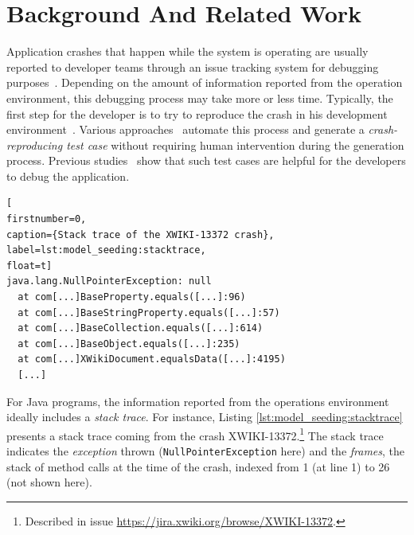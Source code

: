 
\section{Background And Related Work}\label{sec:model_seeding:background}


Application crashes that happen while the system is operating are usually reported to developer teams through an issue tracking system for debugging purposes~\cite{DBLP:conf/iwpc/WhiteVJBP15}. Depending on the amount of information reported from the operation environment, this debugging process may take more or less time. Typically, the first step for the developer is to try to reproduce the crash in his development environment~\cite{Zeller2009}. Various approaches~\cite{Chen2015, Nayrolles2017, Xuan2015, BPT17concrash, soltani2017} automate this process and generate a \emph{crash-reproducing test case} without requiring human intervention during the generation process.  Previous studies~\cite{Chen2015,Soltani2018a} show that such test cases are helpful for the developers to debug the application.

\begin{lstlisting}[
firstnumber=0,
caption={Stack trace of the XWIKI-13372 crash},
label=lst:model_seeding:stacktrace,
float=t]
java.lang.NullPointerException: null
  at com[...]BaseProperty.equals([...]:96)
  at com[...]BaseStringProperty.equals([...]:57)
  at com[...]BaseCollection.equals([...]:614)
  at com[...]BaseObject.equals([...]:235)
  at com[...]XWikiDocument.equalsData([...]:4195)
  [...]
\end{lstlisting}

For Java programs, the information reported from the operations environment ideally includes a \emph{stack trace}. For instance, Listing \ref{lst:model_seeding:stacktrace} presents a stack trace coming from the crash XWIKI-13372.\footnote{Described in  issue \url{https://jira.xwiki.org/browse/XWIKI-13372}.} The stack trace indicates the \emph{exception} thrown (\texttt{Null\-Pointer\-Exception} here) and the \emph{frames}, \ie the stack of method calls at the time of the crash, indexed from 1 (at line 1) to 26 (not shown here).

